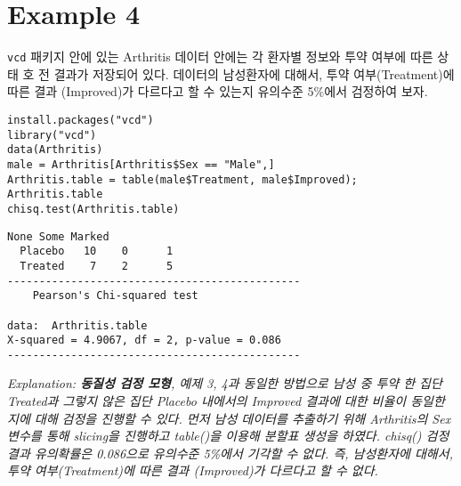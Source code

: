 \documentclass{article}
\begin{document}
\section*{Example 4}
\texttt{vcd} 패키지 안에 있는 Arthritis 데이터 안에는 각 환자별 정보와 투약 여부에 따른 상태 호
전 결과가 저장되어 있다. 데이터의 남성환자에 대해서, 투약 여부(Treatment)에 따른 결과
(Improved)가 다르다고 할 수 있는지 유의수준 5\%에서 검정하여 보자. 
\begin{lstlisting}[style={r-style}]
install.packages("vcd")
library("vcd")
data(Arthritis)
male = Arthritis[Arthritis$Sex == "Male",]
Arthritis.table = table(male$Treatment, male$Improved); Arthritis.table
chisq.test(Arthritis.table)
\end{lstlisting}
\begin{lstlisting}[style={out-style}]
          None Some Marked
  Placebo   10    0      1
  Treated    7    2      5
----------------------------------------------
	Pearson's Chi-squared test

data:  Arthritis.table
X-squared = 4.9067, df = 2, p-value = 0.086
----------------------------------------------
\end{lstlisting}
\emph{Explanation: \textbf{동질성 검정 모형}, 예제 3, 4과 동일한 방법으로 남성 중 투약 한 집단 Treated과 그렇지 않은 집단 Placebo 내에서의 Improved 결과에 대한 비율이 동일한지에 대해 검정을 진행할 수 있다. 먼저 남성 데이터를 추출하기 위해 Arthritis의 Sex 변수를 통해 slicing을 진행하고 table()을 이용해 분할표 생성을 하였다. chisq() 검정 결과 유의확률은 0.086으로 유의수준 5\%에서 기각할 수 없다. 즉, 남성환자에 대해서, 투약 여부(Treatment)에 따른 결과
(Improved)가 다르다고 할 수 없다.} \\
\end{document}
